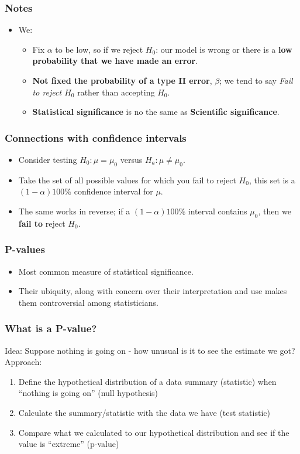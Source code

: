 \documentclass[10pt,article]{article}
\begin{document}
\subsubsection{Notes}
\label{sec:org1374b45}
\begin{itemize}
\item We:
\begin{itemize}
\item Fix {\color{green}\(\alpha\) to be low}, so if we reject \(H_0\): our model is wrong or there is a \textbf{low probability that we have made an error}.
\item \textbf{Not fixed the probability of a type II error}, {\color{green}\(\beta\)}; we tend to say \emph{Fail to reject \(H_0\)} rather than accepting \(H_0\).
\item \textbf{Statistical significance} is no the same as \textbf{Scientific significance}.
\end{itemize}
\end{itemize}
\subsubsection{Connections with confidence intervals}
\label{sec:orga777fd5}
\begin{itemize}
\item Consider testing \(H_0: \mu = \mu_0\) versus \(H_a: \mu \neq \mu_0\).
\item Take the set of all possible values for which you fail to reject \(H_0\), this set is a \((1-\alpha)100\%\) confidence interval for \(\mu\).
\item The same works in reverse; if a \((1-\alpha)100\%\) interval contains \(\mu_0\), then we \textbf{fail  to} reject \(H_0\).
\end{itemize}
\subsubsection{P-values}
\label{sec:orgae958bb}
\begin{itemize}
\item Most common measure of statistical significance.
\item Their ubiquity, along with concern over their interpretation and use makes them controversial among statisticians.
\end{itemize}
\subsubsection{What is a P-value?}
\label{sec:orgebce5c6}
Idea: Suppose nothing is going on - how unusual is it to see the estimate we got?
Approach:
\begin{enumerate}
\item Define the hypothetical distribution of a data summary (statistic) when ``nothing is going on'' (null hypothesis)
\item Calculate the summary/statistic with the data we have (test statistic)
\item Compare what we calculated to our hypothetical distribution and see if the value is ``extreme'' (p-value)
\end{enumerate}
\end{document}
